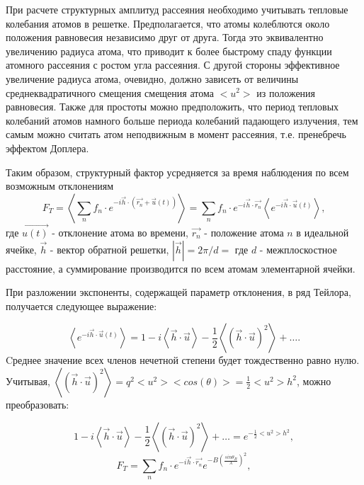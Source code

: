 
При расчете структурных амплитуд рассеяния необходимо учитывать
тепловые колебания атомов в решетке. Предполагается, что атомы колеблются около положения
равновесия независимо друг от друга. Тогда это эквивалентно увеличению радиуса атома,
что приводит к более быстрому спаду функции атомного рассеяния с ростом угла рассеяния.
С другой стороны эффективное увеличение радиуса атома, очевидно, должно зависеть от
величины среднеквадратичного смещения смещения атома  $<u^2>$ из положения равновесия.
Также для простоты можно предположить, что период тепловых колебаний атомов намного больше периода
колебаний падающего излучения, тем самым можно считать атом неподвижным в момент рассеяния,
т.е. пренебречь эффектом Доплера.

Таким образом, структурный фактор усредняется за время наблюдения по всем возможным отклонениям
\begin{equation}
  F_T = \left\langle \sum_{n} f_n \cdot  e^{-i\vec {h} \cdot (\vec{r_n}+ \vec{u}(t))} \right\rangle =  \sum_{n} f_n \cdot  e^{-i\vec {h} \cdot \vec{r_n}}  \left\langle e^{-i \vec{h} \cdot \vec {u}(t)  } \right\rangle,
 \end{equation}
\noindent
где $\vec{u(t)}$ - отклонение атома во времени, $\vec{r_n}$ - положение атома $n$
в идеальной ячейке, $\vec{h}$ - вектор обратной решетки, $|\vec{h}| = 2 \pi / d = $ где $d$ - межплоскостное расстояние,
а суммирование производится по всем атомам элементарной ячейки.

При разложении экспоненты, содержащей параметр отклонения, в ряд Тейлора, получается следующее выражение:

\begin{equation}
  \left\langle e^{-i \vec{h} \cdot \vec {u}(t)  } \right\rangle = 1 - i  \left\langle \vec{h} \cdot \vec {u} \right\rangle - \frac{1}{2} \left\langle (\vec{h} \cdot \vec {u})^2 \right\rangle+ \ldots .
 \end{equation}
\noindent
 Cреднее значение всех членов нечетной степени будет тождественно равно нулю.
Учитывая,  $ \left\langle (\vec{h} \cdot \vec {u})^2 \right\rangle = q^2 <u^2> <cos(\theta)> = \frac{1}{2}<u^2>h^2$, можно преобразовать:

\begin{equation}
1 - i  \left\langle \vec{h} \cdot \vec {u} \right\rangle - \frac{1}{2} \left\langle (\vec{h} \cdot \vec {u})^2 \right\rangle+ \ldots = e^{-\frac{1}{2} <u^2> h^2},
 \end{equation}
 \begin{equation}
   F_T =  \sum_{n} f_n \cdot  e^{-i\vec {h} \cdot \vec{r_n}}  e^{-B (\frac{sin\theta_B}{\lambda} )^2 },
  \end{equation}
\noindent

